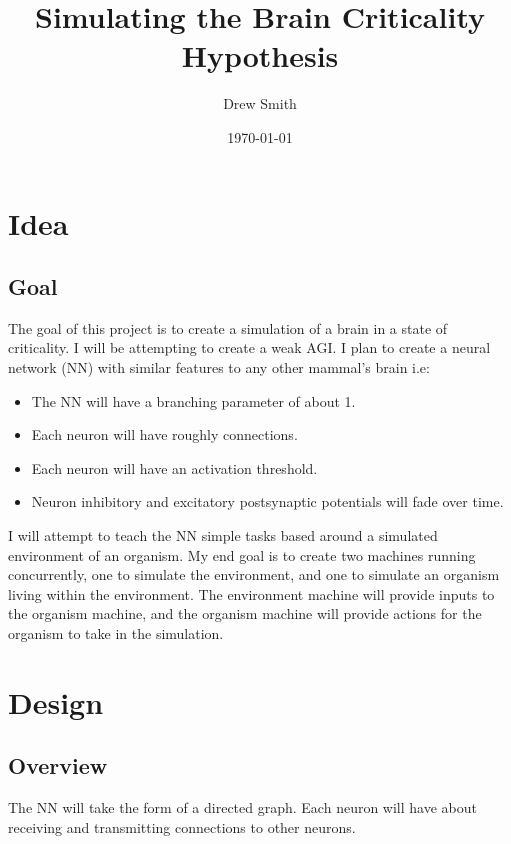 \documentclass{article} %
\title{Simulating the Brain Criticality Hypothesis} %
\author{Drew Smith} %
\date{\today} %
\begin{document}
    \maketitle %
    

    \section{Idea} %
        
        \subsection{Goal}
            The goal of this project is to create a simulation of a brain in a state of criticality. I will be attempting to create a weak AGI. I plan to create a neural network (NN) with similar features to any other mammal's brain i.e:
        
            \begin{itemize}[noitemsep]
                \item The NN will have a branching parameter of about 1.
                \item Each neuron will have roughly \connectionCount{ }connections.
                \item Each neuron will have an activation threshold.
                \item Neuron inhibitory and excitatory postsynaptic potentials will fade over time.
            \end{itemize}

            I will attempt to teach the NN simple tasks based around a simulated environment of an organism. My end goal is to create two machines running concurrently, one to simulate the environment, and one to simulate an organism living within the environment. The environment machine will provide inputs to the organism machine, and the organism machine will provide actions for the organism to take in the simulation.


    \section{Design}
        
        \subsection{Overview}
            The NN will take the form of a directed graph. Each neuron will have about \connectionCount{ }receiving and transmitting connections to other neurons.
        
\end{document}
